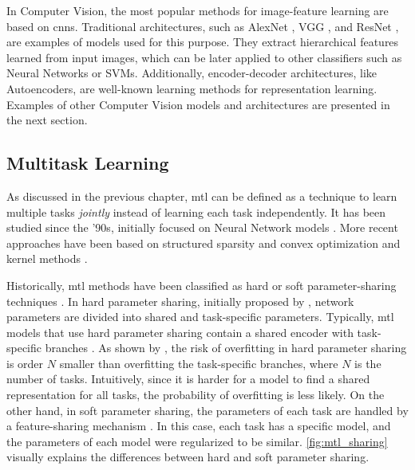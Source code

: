 In Computer Vision, the most popular methods for image-feature learning are based on \aclp{cnn}. Traditional architectures, such as AlexNet \citep{krizhevsky2017imagenet}, VGG \citep{simonyan2014very}, and ResNet \citep{he2016deep}, are examples of models used for this purpose. They extract hierarchical features learned from input images, which can be later applied to other classifiers such as Neural Networks or SVMs. Additionally, encoder-decoder architectures, like Autoencoders, are well-known learning methods for representation learning. Examples of other Computer Vision models and architectures are presented in the next section.
 
\subsection{Multitask Learning}
 
As discussed in the previous chapter, \acl{mtl} can be defined as a technique to learn multiple tasks \textit{jointly} instead of learning each task independently. It has been studied since the '90s, initially focused on Neural Network models \citep{ thrun1998learning, Caruana1997, baxter2000model}. More recent approaches have been based on structured sparsity and convex optimization \citep{argyriou2006multi} and kernel methods \citep{evgeniou2005learning}.
 
Historically, \acs{mtl} methods have been classified as hard or soft parameter-sharing techniques \citep{vandenhende2021multi}. In hard parameter sharing, initially proposed by \cite{Caruana1997}, network parameters are divided into shared and task-specific parameters. Typically, \acs{mtl} models that use hard parameter sharing contain a shared encoder with task-specific branches \citep{kendall2018multi, chen2018gradnorm, sener2018multi}. As shown by \cite{baxter1997bayesian}, the risk of overfitting in hard parameter sharing is order $N$ smaller than overfitting the task-specific branches, where $N$ is the number of tasks. Intuitively, since it is harder for a model to find a shared representation for all tasks, the probability of overfitting is less likely. On the other hand, in soft parameter sharing, the parameters of each task are handled by a feature-sharing mechanism \citep{ruder2019latent, gao2019nddr, liu2019end}. In this case, each task has a specific model, and the parameters of each model were regularized to be similar. \autoref{fig:mtl_sharing} visually explains the differences between hard and soft parameter sharing.
 
